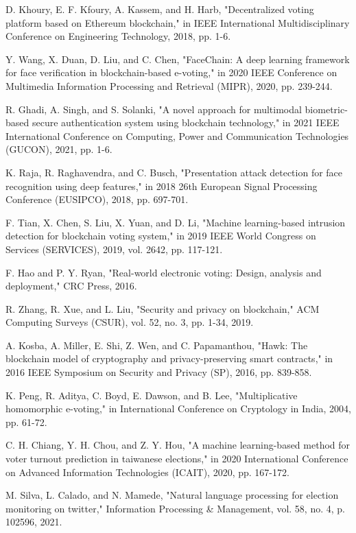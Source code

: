\documentclass[conference]{IEEEtran}
\begin{document}
\begin{thebibliography}{10}
 D. Khoury, E. F. Kfoury, A. Kassem, and H. Harb, "Decentralized voting platform based on Ethereum blockchain," in IEEE International Multidisciplinary Conference on Engineering Technology, 2018, pp. 1-6.

 Y. Wang, X. Duan, D. Liu, and C. Chen, "FaceChain: A deep learning framework for face verification in blockchain-based e-voting," in 2020 IEEE Conference on Multimedia Information Processing and Retrieval (MIPR), 2020, pp. 239-244.

 R. Ghadi, A. Singh, and S. Solanki, "A novel approach for multimodal biometric-based secure authentication system using blockchain technology," in 2021 IEEE International Conference on Computing, Power and Communication Technologies (GUCON), 2021, pp. 1-6.

 K. Raja, R. Raghavendra, and C. Busch, "Presentation attack detection for face recognition using deep features," in 2018 26th European Signal Processing Conference (EUSIPCO), 2018, pp. 697-701.

 F. Tian, X. Chen, S. Liu, X. Yuan, and D. Li, "Machine learning-based intrusion detection for blockchain voting system," in 2019 IEEE World Congress on Services (SERVICES), 2019, vol. 2642, pp. 117-121.

 F. Hao and P. Y. Ryan, "Real-world electronic voting: Design, analysis and deployment," CRC Press, 2016.

 R. Zhang, R. Xue, and L. Liu, "Security and privacy on blockchain," ACM Computing Surveys (CSUR), vol. 52, no. 3, pp. 1-34, 2019.

 A. Kosba, A. Miller, E. Shi, Z. Wen, and C. Papamanthou, "Hawk: The blockchain model of cryptography and privacy-preserving smart contracts," in 2016 IEEE Symposium on Security and Privacy (SP), 2016, pp. 839-858.

 K. Peng, R. Aditya, C. Boyd, E. Dawson, and B. Lee, "Multiplicative homomorphic e-voting," in International Conference on Cryptology in India, 2004, pp. 61-72.

 C. H. Chiang, Y. H. Chou, and Z. Y. Hou, "A machine learning-based method for voter turnout prediction in taiwanese elections," in 2020 International Conference on Advanced Information Technologies (ICAIT), 2020, pp. 167-172.

 M. Silva, L. Calado, and N. Mamede, "Natural language processing for election monitoring on twitter," Information Processing & Management, vol. 58, no. 4, p. 102596, 2021.

\end{thebibliography}
\end{document}
